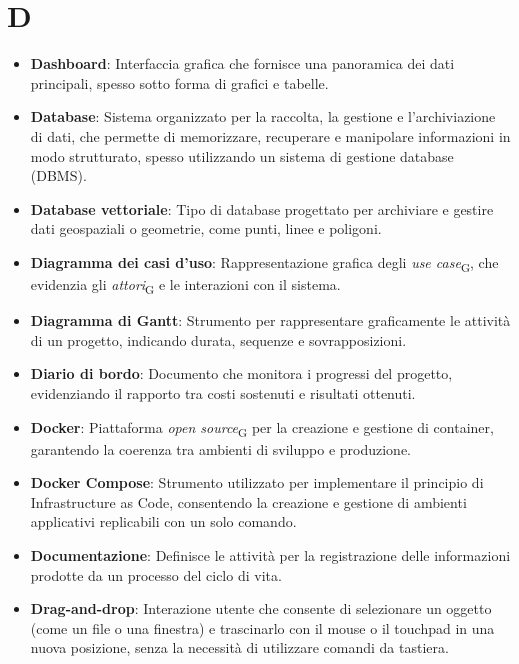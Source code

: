 \section{D}
\begin{itemize}
    \item \textbf{Dashboard}: Interfaccia grafica che fornisce una panoramica dei dati principali, spesso sotto forma di grafici e tabelle.
    \item \textbf{Database}: Sistema organizzato per la raccolta, la gestione e l'archiviazione di dati, che permette di memorizzare, recuperare e manipolare informazioni in modo strutturato, spesso utilizzando un sistema di gestione database (DBMS).
    \item \textbf{Database vettoriale}: Tipo di database progettato per archiviare e gestire dati geospaziali o geometrie, come punti, linee e poligoni.
    \item \textbf{Diagramma dei casi d’uso}: Rappresentazione grafica degli \textit{use case}\textsubscript{G}, che evidenzia gli \textit{attori}\textsubscript{G} e le interazioni con il sistema.
    \item \textbf{Diagramma di Gantt}: Strumento per rappresentare graficamente le attività di un progetto, indicando durata, sequenze e sovrapposizioni.
    \item \textbf{Diario di bordo}: Documento che monitora i progressi del progetto, evidenziando il rapporto tra costi sostenuti e risultati ottenuti.
    \item \textbf{Docker}: Piattaforma \textit{open source}\textsubscript{G} per la creazione e gestione di container, garantendo la coerenza tra ambienti di sviluppo e produzione.
    \item \textbf{Docker Compose}: Strumento utilizzato per implementare il principio di Infrastructure as Code, consentendo la creazione e gestione di ambienti applicativi replicabili con un solo comando.
    \item \textbf{Documentazione}: Definisce le attività per la registrazione delle informazioni prodotte da un processo del ciclo di vita.
    \item \textbf{Drag-and-drop}: Interazione utente che consente di selezionare un oggetto (come un file o una finestra) e trascinarlo con il mouse o il touchpad in una nuova posizione, senza la necessità di utilizzare comandi da tastiera.
\end{itemize}

